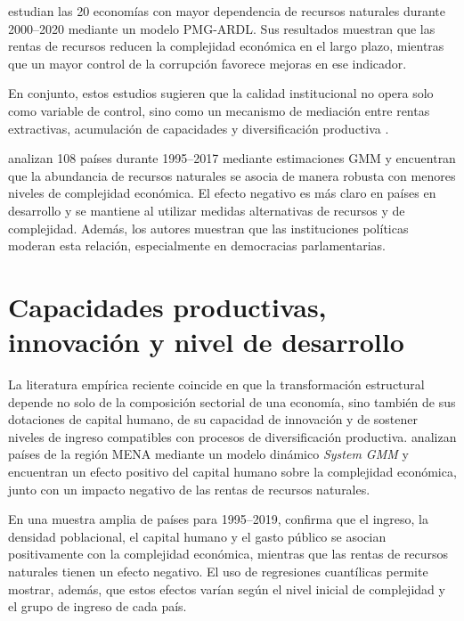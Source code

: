\documentclass[../../PTFM.tex]{subfiles}
\begin{document}
	\textcite{Owjimehr2024} estudian las 20 economías con mayor dependencia de recursos naturales durante 2000--2020 mediante un modelo PMG-ARDL. Sus resultados muestran que las rentas de recursos reducen la complejidad económica en el largo plazo, mientras que un mayor control de la corrupción favorece mejoras en ese indicador.

	En conjunto, estos estudios sugieren que la calidad institucional no opera solo como variable de control, sino como un mecanismo de mediación entre rentas extractivas, acumulación de capacidades y diversificación productiva \parencite{Ajide2022,Olaniyi-Odhiambo2025-3,Olaniyi-Odhiambo2025}.

	\textcite{Avom2022} analizan 108 países durante 1995--2017 mediante estimaciones GMM y encuentran que la abundancia de recursos naturales se asocia de manera robusta con menores niveles de complejidad económica. El efecto negativo es más claro en países en desarrollo y se mantiene al utilizar medidas alternativas de recursos y de complejidad. Además, los autores muestran que las instituciones políticas moderan esta relación, especialmente en democracias parlamentarias.

	\section{Capacidades productivas, innovación y nivel de desarrollo}
	\label{sec:capacidades-innovacion-desarrollo}
	
	La literatura empírica reciente coincide en que la transformación estructural depende no solo de la composición sectorial de una economía, sino también de sus dotaciones de capital humano, de su capacidad de innovación y de sostener niveles de ingreso compatibles con procesos de diversificación productiva. \textcite{YaseminYalta2021} analizan países de la región MENA mediante un modelo dinámico \textit{System GMM} y encuentran un efecto positivo del capital humano sobre la complejidad económica, junto con un impacto negativo de las rentas de recursos naturales.

	En una muestra amplia de países para 1995--2019, \textcite{Chu2023} confirma que el ingreso, la densidad poblacional, el capital humano y el gasto público se asocian positivamente con la complejidad económica, mientras que las rentas de recursos naturales tienen un efecto negativo. El uso de regresiones cuantílicas permite mostrar, además, que estos efectos varían según el nivel inicial de complejidad y el grupo de ingreso de cada país.
\end{document}
